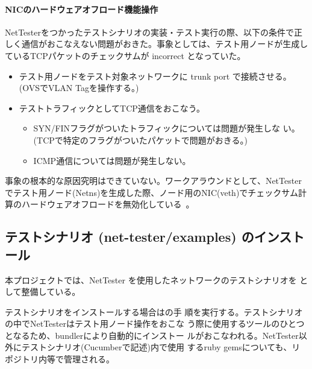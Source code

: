     \paragraph{NICのハードウェアオフロード機能操作}
NetTesterをつかったテストシナリオの実装・テスト実行の際、以下の条件で正
しく通信がおこなえない問題がおきた。事象としては、テスト用ノードが生成し
ているTCPパケットのチェックサムが incorrect となっていた。
\begin{itemize}
 \item テスト用ノードをテスト対象ネットワークに trunk port で接続させる。
       (OVSでVLAN Tagを操作する。)
 \item テストトラフィックとしてTCP通信をおこなう。
       \begin{itemize}
        \item SYN/FINフラグがついたトラフィックについては問題が発生しな
              い。(TCPで特定のフラグがついたパケットで問題がおきる。)
        \item ICMP通信については問題が発生しない。
       \end{itemize}
\end{itemize}
事象の根本的な原因究明はできていない。ワークアラウンドとして、NetTester
でテスト用ノード(Netns)を生成した際、ノード用のNIC(veth)でチェックサム計
算のハードウェアオフロードを無効化している~\cite{net-tester-pr7}。

  \subsection{テストシナリオ (net-tester/examples) のインストール}
  \label{sec:deploy-test-cenario}


本プロジェクトでは、NetTester を使用したネットワークのテストシナリオを
\nettesterex として整備している。

テストシナリオをインストールする場合はの手
順を実行する。テストシナリオの中でNetTesterはテスト用ノード操作をおこな
う際に使用するツールのひとつとなるため、bundlerにより自動的にインストー
ルがおこなわれる。NetTester以外にテストシナリオ(Cucumberで記述)内で使用
するruby gemsについても、リポジトリ内等で管理される。

